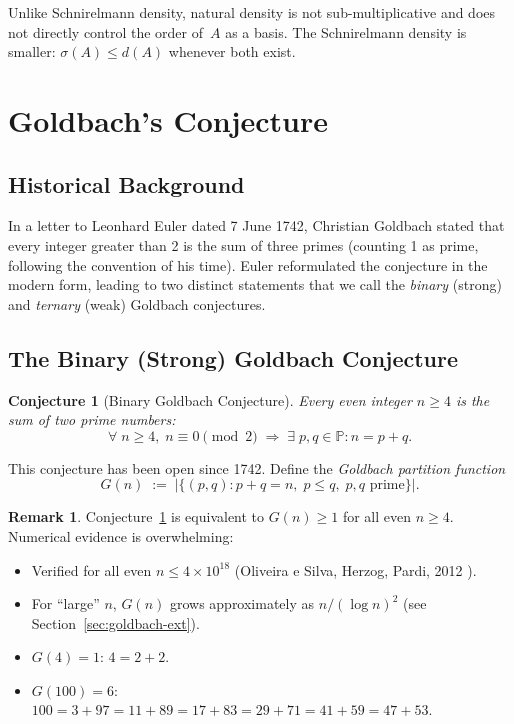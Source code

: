 \documentclass[12pt,a4paper]{amsart}
\newtheorem{conjecture}[theorem]{Conjecture}
\theoremstyle{definition}
\newtheorem{remark}[theorem]{Remark}
\newcommand{\Primes}{\mathbb{P}}
\newcommand{\abs}[1]{\left|#1\right|}
\begin{document}
Unlike Schnirelmann density, natural density is not sub-multiplicative
and does not directly control the order of~$A$ as a basis.  The
Schnirelmann density is smaller: $\sigma(A) \leq d(A)$ whenever both
exist.

\section{Goldbach's Conjecture}\label{sec:goldbach}

\subsection{Historical Background}

In a letter to Leonhard Euler dated 7 June 1742, Christian Goldbach
stated that every integer greater than 2 is the sum of three primes
(counting 1 as prime, following the convention of his time).  Euler
reformulated the conjecture in the modern form, leading to two distinct
statements that we call the \emph{binary} (strong) and \emph{ternary}
(weak) Goldbach conjectures.

\subsection{The Binary (Strong) Goldbach Conjecture}

\begin{conjecture}[Binary Goldbach Conjecture]\label{conj:goldbach-binary}
Every even integer $n \geq 4$ is the sum of two prime numbers:
\[
  \forall\; n \geq 4,\; n \equiv 0 \pmod{2} \;\Longrightarrow\;
  \exists\; p, q \in \Primes : n = p + q.
\]
\end{conjecture}

This conjecture has been open since 1742.  Define the
\emph{Goldbach partition function}
\[
  G(n) \;:=\; \abs{\bigl\{(p, q) : p + q = n,\; p \leq q,\;
                p, q \text{ prime}\bigr\}}.
\]

\begin{remark}
Conjecture~\ref{conj:goldbach-binary} is equivalent to $G(n) \geq 1$
for all even $n \geq 4$.  Numerical evidence is overwhelming:
\begin{itemize}
\item Verified for all even $n \leq 4 \times 10^{18}$
      (Oliveira e Silva, Herzog, Pardi, 2012 \cite{OliveiraSilva2012}).
\item For ``large'' $n$, $G(n)$ grows approximately as
      $n / (\log n)^2$ (see Section~\ref{sec:goldbach-ext}).
\item $G(4) = 1$: $4 = 2 + 2$.
\item $G(100) = 6$: $100 = 3+97 = 11+89 = 17+83 = 29+71 = 41+59 = 47+53$.
\end{itemize}
\end{remark}
\end{document}
